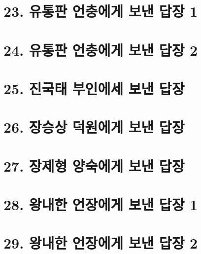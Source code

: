 \documentclass[12pt, a4paper, oneside]{book}
\let\stdsection\section
\renewcommand\section{\newpage\stdsection}
\begin{document}
	\section{23. 유통판 언충에게 보낸 답장 1}

%
	\section{24. 유통판 언충에게 보낸 답장 2}

%
	\section{25. 진국태 부인에세 보낸 답장 }

%
	\section{26. 장승상 덕원에게 보낸 답장 }

%
	\section{27. 장제형 양숙에게 보낸 답장 }

%
	\section{28. 왕내한 언장에게 보낸 답장 1 }

%
	\section{29. 왕내한 언장에게 보낸 답장 2 }
\end{document}
